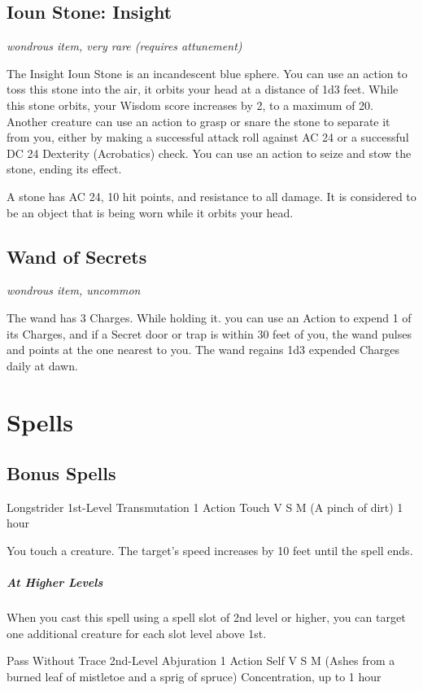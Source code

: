 \documentclass[letterpaper,openany,oneside,twocolumn]{book}
\begin{document}
\subsection*{Ioun Stone: Insight}
\textit{wondrous item, very rare (requires attunement)}

The Insight Ioun Stone is an incandescent blue sphere. You can use an action to toss this stone into the air, it orbits your head at a distance of 1d3 feet. While this stone orbits, your Wisdom score increases by 2, to a maximum of 20. Another creature can use an action to grasp or snare the stone to separate it from you, either by making a successful attack roll against AC 24 or a successful DC 24 Dexterity (Acrobatics) check. You can use an action to seize and stow the stone, ending its effect.

A stone has AC 24, 10 hit points, and resistance to all damage. It is considered to be an object that is being worn while it orbits your head.

\subsection*{Wand of Secrets}
\textit{wondrous item, uncommon}

The wand has 3 Charges. While holding it. you can use an Action to expend 1 of its Charges, and if a Secret door or trap is within 30 feet of you, the wand pulses and points at the one nearest to you. The wand regains 1d3 expended Charges daily at dawn.

\section*{Spells}

\subsection*{Bonus Spells}

\DndSpellHeader
  {Longstrider}
  {1st-Level Transmutation}
  {1 Action}
  {Touch}
  {V S M (A pinch of dirt)}
  {1 hour}

You touch a creature. The target's speed increases by 10 feet until the spell ends.

\subparagraph*{At Higher Levels} When you cast this spell using a spell slot of 2nd level or higher, you can target one additional creature for each slot level above 1st.

\DndSpellHeader
  {Pass Without Trace}
  {2nd-Level Abjuration}
  {1 Action}
  {Self}
  {V S M (Ashes from a burned leaf of mistletoe and a sprig of spruce)}
  {Concentration, up to 1 hour}
\end{document}
